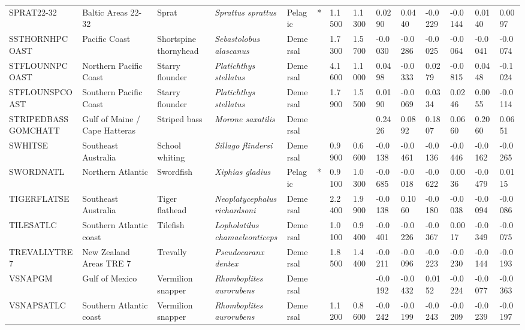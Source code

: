 \begin{longtable}{p{2.6cm}p{1.9cm}p{1.7cm}p{1.6cm}p{1cm}p{0.3cm}p{1cm}p{1cm}p{1cm}p{1.1cm}p{1cm}p{1.1cm}p{1cm}p{1.1cm}}
  SPRAT22-32 & Baltic Areas 22-32 & Sprat & \textit{Sprattus sprattus} & Pelagic & * & 1.1500 & 1.1300 & 0.0290 & 0.0440 & -0.0229 & -0.0144 & 0.0140 & 0.0097 \\ 
  SSTHORNHPCOAST & Pacific Coast & Shortspine thornyhead & \textit{Sebastolobus alascanus} & Demersal &   & 1.7300 & 1.5700 & -0.0030 & -0.0286 & -0.0025 & -0.0064 & -0.0041 & -0.0074 \\ 
  STFLOUNNPCOAST & Northern Pacific Coast & Starry flounder & \textit{Platichthys stellatus} & Demersal &   & 4.1600 & 1.1000 & 0.0498 & -0.0333 & 0.0279 & -0.0815 & 0.0448 & -0.1024 \\ 
  STFLOUNSPCOAST & Southern Pacific Coast & Starry flounder & \textit{Platichthys stellatus} & Demersal &   & 1.7900 & 1.5500 & 0.0190 & -0.0069 & 0.0334 & 0.0246 & 0.0055 & -0.0114 \\ 
  STRIPEDBASSGOMCHATT & Gulf of Maine / Cape Hatteras & Striped bass & \textit{Morone saxatilis} & Demersal &  &  &  & 0.2426 & 0.0892 & 0.1807 & 0.0660 & 0.2060 & 0.0651 \\ 
  SWHITSE & Southeast Australia & School whiting & \textit{Sillago flindersi} & Demersal &   & 0.9900 & 0.6600 & -0.0138 & -0.0461 & -0.0136 & -0.0446 & -0.0162 & -0.0265 \\ 
  SWORDNATL & Northern Atlantic & Swordfish & \textit{Xiphias gladius} & Pelagic & * & 0.9100 & 1.0300 & -0.0685 & -0.0018 & -0.0622 & 0.0036 & -0.0479 & 0.0115 \\ 
  TIGERFLATSE & Southeast Australia & Tiger flathead & \textit{Neoplatycephalus richardsoni} & Demersal &   & 2.2400 & 1.9900 & -0.0138 & 0.1060 & -0.0180 & -0.0038 & -0.0094 & -0.0086 \\ 
  TILESATLC & Southern Atlantic coast & Tilefish & \textit{Lopholatilus chamaeleonticeps} & Demersal &   & 1.0100 & 0.9400 & -0.0401 & -0.0226 & -0.0367 & 0.0017 & -0.0349 & -0.0075 \\ 
  TREVALLYTRE7 & New Zealand Areas TRE 7 & Trevally & \textit{Pseudocaranx dentex} & Demersal &   & 1.8500 & 1.4400 & -0.0211 & -0.0096 & -0.0223 & -0.0230 & -0.0144 & -0.0193 \\ 
  VSNAPGM & Gulf of Mexico & Vermilion snapper & \textit{Rhomboplites aurorubens} & Demersal &  &  &  & -0.0192 & -0.0432 & 0.0152 & -0.0224 & -0.0077 & -0.0363 \\ 
  VSNAPSATLC & Southern Atlantic coast & Vermilion snapper & \textit{Rhomboplites aurorubens} & Demersal &   & 1.1200 & 0.8600 & -0.0242 & -0.0199 & -0.0243 & -0.0209 & -0.0239 & -0.0197 \\ 

\end{longtable}

